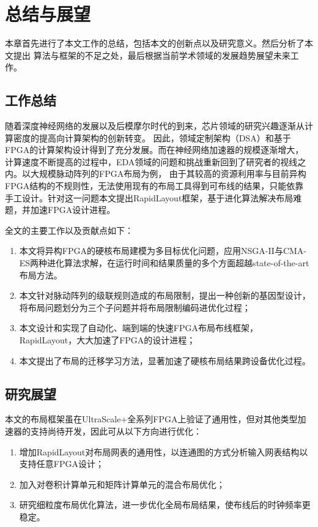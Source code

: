 \chapter{总结与展望}

本章首先进行了本文工作的总结，包括本文的创新点以及研究意义。然后分析了本文提出
算法与框架的不足之处，最后根据当前学术领域的发展趋势展望未来工作。

\section{工作总结}

随着深度神经网络的发展以及后模摩尔时代的到来，芯片领域的研究兴趣逐渐从计算密度的提高向计算架构的创新转变。
因此，领域定制架构（DSA）和基于FPGA的计算架构设计得到了充分发展。而在神经网络加速器的规模逐渐增大，
计算速度不断提高的过程中，EDA领域的问题和挑战重新回到了研究者的视线之内。以大规模脉动阵列的FPGA布局为例，
由于其较高的资源利用率与目前异构FPGA结构的不规则性，无法使用现有的布局工具得到可布线的结果，只能依靠
手工设计。针对这一问题本文提出RapidLayout框架，基于进化算法解决布局难题，并加速FPGA设计进程。

全文的主要工作以及贡献点如下：


\begin{enumerate}
    \item 本文将异构FPGA的硬核布局建模为多目标优化问题，应用NSGA-II与CMA-ES两种进化算法求解，在运行时间和结果质量的多个方面超越state-of-the-art布局方法。
    \item 本文针对脉动阵列的级联规则造成的布局限制，提出一种创新的基因型设计，将布局问题划分为三个子问题并将布局限制编码进优化过程；    
    \item 本文设计和实现了自动化、端到端的快速FPGA布局布线框架，RapidLayout，大大加速了FPGA的设计进程；
    \item 本文提出了布局的迁移学习方法，显著加速了硬核布局结果跨设备优化过程。
\end{enumerate}



\section{研究展望}

本文的布局框架虽在UltraScale+全系列FPGA上验证了通用性，但对其他类型加速器的支持尚待开发，因此可从以下方向进行优化：

\begin{enumerate}
    \item 增加RapidLayout对布局网表的通用性，以连通图的方式分析输入网表结构以支持任意FPGA设计；
    \item 加入对卷积计算单元和矩阵计算单元的混合布局优化；
    \item 研究细粒度布局优化算法，进一步优化全局布局结果，使布线后的时钟频率更稳定。
\end{enumerate}